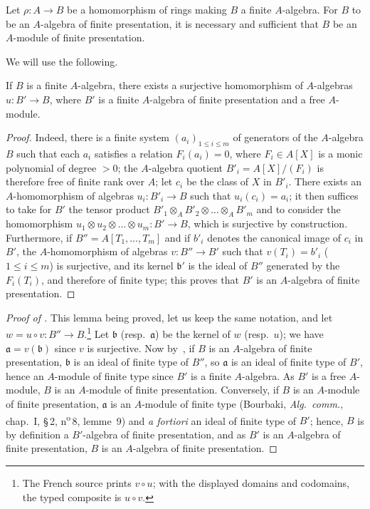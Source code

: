 \begin{proposition}[1.4.7]
\label{IV.1.4.7}
Let $\rho:A\to B$ be a homomorphism of rings making $B$ a finite $A$-algebra.
For $B$ to be an $A$-algebra of finite presentation, it is necessary and sufficient that $B$ be an $A$-module of finite presentation.
\end{proposition}

We will use the following.

\begin{lemma}[1.4.7.1]
\label{IV.1.4.7.1}
If $B$ is a finite $A$-algebra, there exists a surjective homomorphism of $A$-algebras $u:B'\to B$, where $B'$ is a finite $A$-algebra of finite presentation and a free $A$-module.
\end{lemma}

\begin{proof}
Indeed, there is a finite system $(a_i)_{1\leq i\leq m}$ of generators of the $A$-algebra $B$ such that each $a_i$ satisfies a relation $F_i(a_i)=0$, where $F_i\in A[X]$ is a monic polynomial of degree $>0$; the $A$-algebra quotient $B'_i=A[X]/(F_i)$ is therefore free of finite rank over $A$; let $c_i$ be the class of $X$ in $B'_i$.
There exists an $A$-homomorphism of algebras $u_i:B'_i\to B$ such that $u_i(c_i)=a_i$; it then suffices to take for $B'$ the tensor product $B'_1\otimes_A B'_2\otimes\ldots\otimes_A B'_m$ and to consider the homomorphism $u_1\otimes u_2\otimes\ldots\otimes u_m:B'\to B$, which is surjective by construction.
Furthermore, if $B''=A[T_1,\ldots,T_m]$ and if $b'_i$ denotes the canonical image of $c_i$ in $B'$, the $A$-homomorphism of algebras $v:B''\to B'$ such that $v(T_i)=b'_i$ ($1\leq i\leq m$) is surjective, and its kernel $\mathfrak{b}'$ is the ideal of $B''$ generated by the $F_i(T_i)$, and therefore of finite type; this proves that $B'$ is an $A$-algebra of finite presentation.
\end{proof}

\begin{proof}[Proof of {\rm{}}]
This lemma being proved, let us keep the same notation, and let $w=u\circ v:B''\to B$.\footnote{The French source prints $v\circ u$; with the displayed domains and codomains, the typed composite is $u\circ v$.}
Let $\mathfrak{b}$ (resp.~$\mathfrak{a}$) be the kernel of $w$ (resp.~$u$); we have $\mathfrak{a}=v(\mathfrak{b})$ since $v$ is surjective.
Now by~, if $B$ is an $A$-algebra of finite presentation, $\mathfrak{b}$ is an ideal of finite type of $B''$, so $\mathfrak{a}$ is an ideal of finite type of $B'$, hence an $A$-module of finite type since $B'$ is a finite $A$-algebra.
As $B'$ is a free $A$-module, $B$ is an $A$-module of finite presentation.
Conversely, if $B$ is an $A$-module of finite presentation, $\mathfrak{a}$ is an $A$-module of finite type (Bourbaki, \emph{Alg.~comm.}, chap.~I, \S\,2, n\textsuperscript{o}\,8, lemme~9) and \emph{a fortiori} an ideal of finite type of $B'$; hence, $B$ is by definition a $B'$-algebra of finite presentation, and as $B'$ is an $A$-algebra of finite presentation, $B$ is an $A$-algebra of finite presentation.
\end{proof}

